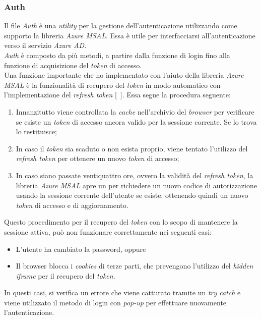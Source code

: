 \subsubsection{Auth}\label{subsubsec:auth-utils}
Il file \textit{Auth} è una \textit{utility} per la gestione dell'autenticazione utilizzando come supporto la libreria \textit{Azure MSAL}. Essa è utile
per interfacciarsi all'autenticazione verso il servizio \textit{Azure AD}.\\
\textit{Auth} è composto da più metodi, a partire dalla funzione di login fino alla funzione di acquisizione del \textit{token} di accesso.\\
Una funzione importante che ho implementato con l'aiuto della libreria \textit{Azure MSAL} è la funzionalità di recupero del \textit{token} in modo automatico con 
l'implementazione del \textit{refresh token} [~\cite{site:token}]. Essa segue la procedura seguente:
\begin{enumerate}
  \item Innanzitutto viene controllata la \textit{cache} nell'archivio del \textit{browser} per verificare se esiste un \textit{token} di accesso ancora valido per la sessione corrente. Se lo trova lo restituisce;
  \item In caso il \textit{token} sia scaduto o non esista proprio, viene tentato l'utilizzo del \textit{refresh token} per ottenere un nuovo \textit{token} di accesso;
  \item In caso siano passate ventiquattro ore, ovvero la validità del \textit{refresh token}, la libreria \textit{Azure MSAL} apre un  per richiedere
  un nuovo codice di autorizzazione usando la sessione corrente dell'utente se esiste, ottenendo quindi un nuovo \textit{token} di accesso e di aggiornamento. 
\end{enumerate}
Questo procedimento per il recupero del \textit{token} con lo scopo di mantenere la sessione attiva, può non funzionare correttamente nei seguenti casi:
\begin{itemize}
  \item L'utente ha cambiato la password, oppure
  \item Il browser blocca i \textit{cookies} di terze parti, che prevengono l'utilizzo del \textit{hidden iframe} per il recupero del \textit{token}.
\end{itemize}
In questi casi, si verifica un errore che viene catturato tramite un \textit{try catch} e viene utilizzato il metodo di login con \textit{pop-up} per effettuare nuovamente l'autenticazione.
